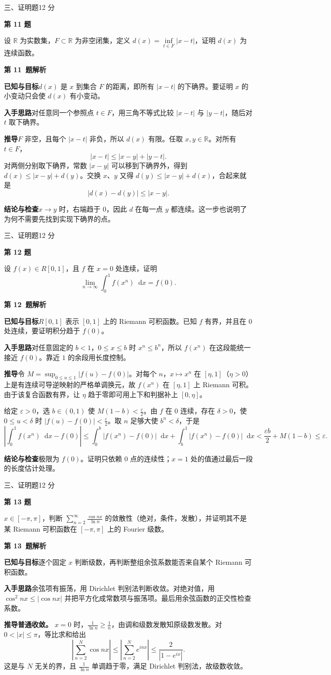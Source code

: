 \documentclass[UTF8,zihao=-4,fontset=fandol]{ctexart}
\newcommand{\dd}{\mathop{}\!\mathrm{d}}
\newcommand{\Question}[3]{%
  \clearpage
  \def\CurrentNumber{#1}%
  \pdfbookmark[1]{第 #1 题}{q#1}%
  {\small #2\hfill #3 分}\par\medskip
  {\Large\bfseries 第 #1 题}\par\medskip
  \fontsize{14}{22}\selectfont
}
\newcommand{\Solution}{%
  \clearpage
  \fontsize{12}{18}\selectfont
  {\large\bfseries 第 \CurrentNumber\ 题解析}\par\smallskip
}
\newcommand{\Known}{\par\textbf{已知与目标}\quad}
\newcommand{\Method}{\par\textbf{入手思路}\quad}
\newcommand{\Derive}{\par\textbf{推导}\quad}
\newcommand{\Verify}{\par\textbf{结论与检查}\quad}
\begin{document}
\Question{11}{三、证明题}{12}
设 $\mathbb R$ 为实数集，$F\subset\mathbb R$ 为非空闭集，定义
$d(x)=\inf\limits_{t\in F}|x-t|$，证明 $d(x)$ 为连续函数。

\Solution
\Known $d(x)$ 是 $x$ 到集合 $F$ 的距离，即所有 $|x-t|$ 的下确界。要证明 $x$ 的小变动只会使 $d(x)$ 有小变动。
\Method 对任意同一个参照点 $t\in F$，用三角不等式比较 $|x-t|$ 与 $|y-t|$，随后对 $t$ 取下确界。
\Derive $F$ 非空，且每个 $|x-t|$ 非负，所以 $d(x)$ 有限。任取 $x,y\in\mathbb R$。对所有 $t\in F$，
\[
|x-t|\le |x-y|+|y-t|.
\]
对两侧分别取下确界，常数 $|x-y|$ 可以移到下确界外，得到 $d(x)\le |x-y|+d(y)$。交换 $x$、$y$ 又得 $d(y)\le |x-y|+d(x)$，合起来就是
\[
|d(x)-d(y)|\le |x-y|.
\]
\Verify $x\to y$ 时，右端趋于 $0$，因此 $d$ 在每一点 $y$ 都连续。这一步也说明了为何不需要先找到实现下确界的点。

\Question{12}{三、证明题}{12}
设 $f(x)\in R[0,1]$，且 $f$ 在 $x=0$ 处连续，证明
\[
\lim\limits_{n\to\infty}\int_0^1 f(x^n)\dd x=f(0).
\]

\Solution
\Known $R[0,1]$ 表示 $[0,1]$ 上的 Riemann 可积函数。已知 $f$ 有界，并且在 $0$ 处连续，要证明积分趋于 $f(0)$。
\Method 对任意固定的 $b<1$，$0\le x\le b$ 时 $x^n\le b^n$，所以 $f(x^n)$ 在这段能统一接近 $f(0)$。靠近 $1$ 的余段用长度控制。
\Derive 令 $M=\sup_{0\le u\le 1}|f(u)-f(0)|$。对每个 $n$，$x\mapsto x^n$ 在 $[\eta,1]$（$\eta>0$）上是有连续可导逆映射的严格单调换元，故 $f(x^n)$ 在 $[\eta,1]$ 上 Riemann 可积。由于该复合函数有界，让 $\eta$ 趋于零即可用上下和判据补上 $[0,\eta]$。

给定 $\varepsilon>0$，选 $b\in(0,1)$ 使 $M(1-b)<\frac{\varepsilon}{2}$。由 $f$ 在 $0$ 连续，存在 $\delta>0$，使 $0\le u<\delta$ 时 $|f(u)-f(0)|<\frac{\varepsilon}{2}$。取 $n$ 足够大使 $b^n<\delta$，于是
\[
\left|\int_0^1 f(x^n)\dd x-f(0)\right|
\le\int_0^b |f(x^n)-f(0)|\dd x+\int_b^1 |f(x^n)-f(0)|\dd x
<\frac{\varepsilon b}{2}+M(1-b)\le\varepsilon.
\]
\Verify 极限为 $\boxed{f(0)}$。证明只依赖 $0$ 点的连续性；$x=1$ 处的值通过最后一段的长度估计处理。

\Question{13}{三、证明题}{12}
$x\in[-\pi,\pi]$，判断 $\displaystyle\sum_{n=2}^{\infty}\frac{\cos nx}{\ln n}$ 的敛散性（绝对，条件，发散），并证明其不是某 Riemann 可积函数在 $[-\pi,\pi]$ 上的 Fourier 级数。

\Solution
\Known 逐个固定 $x$ 判断级数，再判断整组余弦系数能否来自某个 Riemann 可积函数。
\Method 余弦项有振荡，用 Dirichlet 判别法判断收敛。对绝对值，用 $\cos^2 nx\le|\cos nx|$ 并把平方化成常数项与振荡项。最后用余弦函数的正交性检查系数。
\Derive \textbf{普通收敛。} $x=0$ 时，$\frac{1}{\ln n}\ge\frac{1}{n}$，由调和级数发散知原级数发散。对 $0<|x|\le\pi$，等比求和给出
\[
\left|\sum_{n=2}^{N}\cos nx\right|
\le\left|\sum_{n=2}^{N} e^{inx}\right|
\le \frac{2}{|1-e^{ix}|}.
\]
这是与 $N$ 无关的界，且 $\frac{1}{\ln n}$ 单调趋于零，满足 Dirichlet 判别法，故级数收敛。
\end{document}
